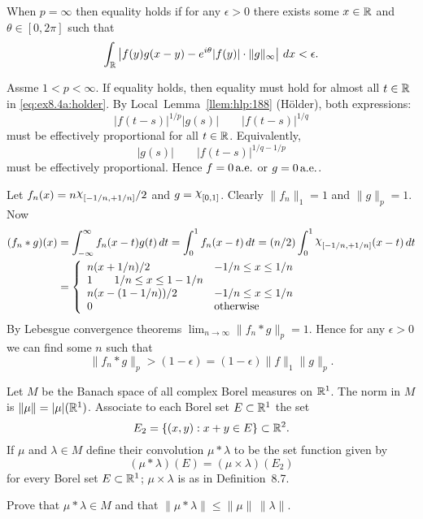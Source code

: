 \begin{enumerate}
\begin{itemize}
When \(p=\infty\) then equality holds 
if for any \(\epsilon>0\) there exists some \(x\in\mathbb{R}\) 
and \(\theta\in[0,2\pi]\)
such that 
\begin{equation*}
\int_{\mathbb{R}}\left| f(y)g(x-y)- e^{i\theta}|f(y)|\cdot\|g\|_\infty\right|\,dx 
< \epsilon.
\end{equation*}


Assme \(1<p<\infty\).
If equality holds, then equality must hold for almost all \(t\in\mathbb{R}\) in 
\eqref{eq:ex8.4a:holder}.
By Local~Lemma~\ref{llem:hlp:188} (H\"older), both expressions:
\begin{equation*}
|f(t-s)|^{1/p} |g(s)|  \qquad  |f(t-s)|^{1/q}
\end{equation*}
must be effectively proportional for all \(t\in\mathbb{R}\).
Equivalently, 
\begin{equation*}
|g(s)|  \qquad  |f(t-s)|^{1/q-1/p}
\end{equation*}
must be effectively proportional. 
Hence \(f=0\,\textrm{a.e.}\) or \(g=0\,\textrm{a.e.}\).

Let \(f_n(x) = n\chhi_{[-1/n,+1/n]}/2\) and \(g = \chhi_{[0,1]}\).
Clearly \(\|f_n\|_1=1\) and
\(\|g\|_p = 1\). Now 
\begin{align*}
(f_n\ast g)(x) 
&= \int_{-\infty}^\infty f_n(x-t)g(t)\,dt
 = \int_0^1 f_n(x-t)\,dt
 = (n/2) \int_0^1 \chhi_{[-1/n,+1/n]}(x-t)\,dt \\
&= \left\{\begin{array}{ll}
    n(x+1/n)/2 \qquad &  -1/n \leq x \leq 1/n \\
    1    \qquad    1/n \leq x \leq 1-1/n \\
    n(x-(1-1/n))/2 \qquad &  -1/n \leq x \leq 1/n \\
    0 \qquad              & \textnormal{otherwise}
   \end{array}\right.
\end{align*}
By Lebesgue convergence theorems
\(\lim_{n\to\infty} \|f_n\ast g\|_p = 1\).
Hence for any \(\epsilon>0\) we can find some $n$ such that 
\begin{equation*}
\| f_n \ast g \|_p > 
(1-\epsilon) =
(1-\epsilon) \|f\|_1 \|g\|_p.
\end{equation*}
\end{itemize}


\begin{excopy}
Let $M$ be the Banach space of all complex Borel measures on \(\mathbb{R}^1\).
The norm in $M$ is \(\|\mu\| = |\mu|(\mathbb{R}^1)\).
Associate to each Borel set \(E \subset \mathbb{R}^1\) the set
\begin{equation*}
E_2 = \{ (x,y): x+y \in E\} \subset \mathbb{R}^2.
\end{equation*}
If \(\mu\) and \(\lambda \in M\) define their convolution \(\mu \ast \lambda\)
to be the set function given by
\begin{equation*}
(\mu \ast \lambda)(E) = (\mu \times \lambda)(E_2)
\end{equation*}
for every Borel set \(E\subset \mathbb{R}^1\);
\(\mu\times\lambda\) is as in Definition~8.7.
\begin{itemize}
Prove that \(\mu \ast \lambda \in M\) and that 
\(\|\mu \ast \lambda\| \leq \|\mu\| \, \|\lambda \|\).


\end{itemize}
\end{excopy}
\end{enumerate}

